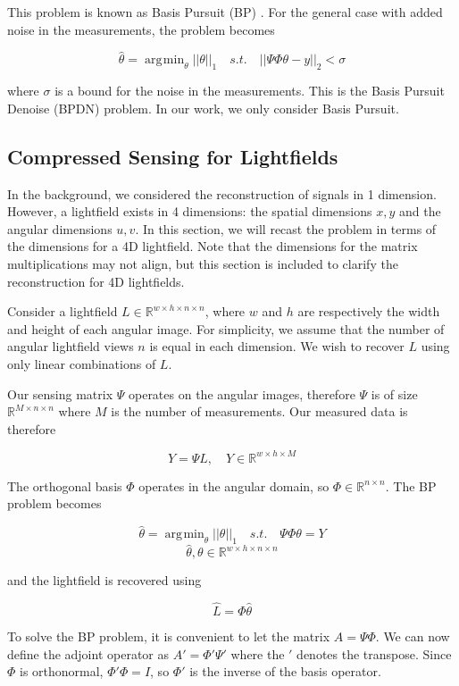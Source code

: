 \documentclass[10pt,twocolumn,letterpaper]{article}
\DeclareMathOperator*{\argmin}{\arg\!\min}
\begin{document}
This problem is known as Basis Pursuit (BP) \cite{BasisPursuit1}. For the general case with added noise in the measurements, the problem becomes

\[ \hat{\theta} = \argmin_\theta ||\theta||_1 \quad s.t. \quad ||\Psi\Phi\theta - y||_2 < \sigma\]


where $\sigma$ is a bound for the noise in the measurements. This is the Basis Pursuit Denoise (BPDN) problem. In our work, we only consider Basis Pursuit.

\subsection{Compressed Sensing for Lightfields}

In the background, we considered the reconstruction of signals in 1 dimension. However, a lightfield exists in 4 dimensions: the spatial dimensions $x, y$ and the angular dimensions $u, v$. In this section, we will recast the problem in terms of the dimensions for a 4D lightfield. Note that the dimensions for the matrix multiplications may not align, but this section is included to clarify the reconstruction for 4D lightfields.

Consider a lightfield $L \in \mathbb{R}^{w \times h \times n \times n}$, where $w$ and $h$ are respectively the width and height of each angular image. For simplicity, we assume that the number of angular lightfield views $n$ is equal in each dimension. We wish to recover $L$ using only linear combinations of $L$.

Our sensing matrix $\Psi$ operates on the angular images, therefore $\Psi$ is of size $\mathbb{R}^{M \times n \times n}$ where $M$ is the number of measurements. Our measured data is therefore

\[Y = \Psi L, \quad Y \in \mathbb{R}^{w \times h \times M}\]

The orthogonal basis $\Phi$ operates in the angular domain, so $\Phi \in \mathbb{R}^{n \times n}$. The BP problem becomes

\[ \hat{\theta} = \argmin_\theta ||\theta||_1 \quad s.t. \quad \Psi\Phi\theta = Y\]
\[ \hat{\theta}, \theta \in \mathbb{R}^{w \times h \times n \times n}\]

and the lightfield is recovered using

\[ \hat{L} = \Phi \hat{\theta}\]

To solve the BP problem, it is convenient to let the matrix $A = \Psi\Phi$. We can now define the adjoint operator as $A' = \Phi'\Psi'$ where the $'$ denotes the transpose. Since $\Phi$ is orthonormal, $\Phi'\Phi = I$, so $\Phi'$ is the inverse of the basis operator. 
\end{document}
